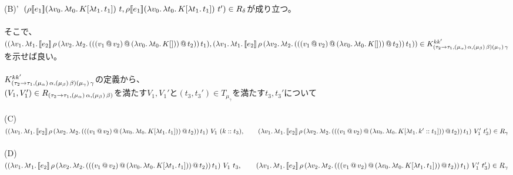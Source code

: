 \documentclass[japanese,draft]{jssst_ppl} %
\begin{document}
  (B)'\ $(\rho [\![{e_1}]\!] (\lambda{v_0}.\,{\lambda{t_0}.\,{K[\lambda{t_1}.\,{t_1}]}})\ t, \rho [\![{e_1}]\!] (\lambda{v_0}.\,{\lambda{t_0}.\,{K[\lambda{t_1}.\,{t_1}]}})\ t')\in R_{\delta}$が成り立つ。\\
\\
そこで、\\
$((\lambda{v_1}.\,{\lambda{t_1}.\,{[\![{e_2}]\!]\,\rho\,(\lambda{v_2}.\,{\lambda{t_2}.\,{({({({v_1}\,@\,{v_2})}\,@\,{(\lambda{v_0}.\,{\lambda{t_0}.\,{K[]}})})}\,@\,{t_2})}})\,t_1}}),\\
 (\lambda{v_1}.\,{\lambda{t_1}.\,{[\![{e_2}]\!]\,\rho\,(\lambda{v_2}.\,{\lambda{t_2}.\,{({({({v_1}\,@\,{v_2})}\,@\,{(\lambda{v_0}.\,{\lambda{t_0}.\,{K[]}})})}\,@\,{t_2})}})\,t_1}}))\in K^{kk'}_{(\tau_2\rightarrow{\tau_1},(\mu_{\alpha})\,\alpha,(\mu_{\beta})\,\beta) (\mu_{\gamma})\,\gamma}$\\
 を示せば良い。\\
 \\
 $K^{kk'}_{(\tau_2\rightarrow{\tau_1},(\mu_{\alpha})\,\alpha,(\mu_{\beta})\,\beta) (\mu_{\gamma})\,\gamma}$の定義から、\\
 $(V_1,V_1')\in R_{(\tau_2\rightarrow{\tau_1},(\mu_{\alpha})\,\alpha,(\mu_{\beta})\,\beta)}$を満たす$V_1,V_1'$と$(t_3,t_3')\in T_{\mu_{\gamma}}$を満たす$t_3,t_3'$について\\
 \\
 (C)\ $(\LamP{v_1}{\Lam{t_1}{\CPS{e_2}{\rho}
            {\LamP{v_2}{\Lam{t_2}
                {\AppP{\AppP{\AppP{v_1}{v_2}}
                    {\LamP{v_0}{\Lam{t_0}
                        {K[\Lam{t_1}{t_1}]}}}}{t_2}}}}{t_1}}}\ V_1\ (\Cons{k}{t_3}),\\
   \qquad    \LamP{v_1}{\Lam{t_1}{\CPS{e_2}{\rho}
            {\LamP{v_2}{\Lam{t_2}
                {\AppP{\AppP{\AppP{v_1}{v_2}}
                    {\LamP{v_0}{\Lam{t_0}
                        {K[\Lam{t_1}{\Cons{k'}{t_1}}]}}}}{t_2}}}}{t_1}}}\ V_1'\ t_3')\in R_{\gamma}$\\
   \\
 (D)\ $(\LamP{v_1}{\Lam{t_1}{\CPS{e_2}{\rho}
            {\LamP{v_2}{\Lam{t_2}
                {\AppP{\AppP{\AppP{v_1}{v_2}}
                    {\LamP{v_0}{\Lam{t_0}
                        {K[\Lam{t_1}{t_1}]}}}}{t_2}}}}{t_1}}}\ V_1\ t_3,\\
   \qquad    \LamP{v_1}{\Lam{t_1}{\CPS{e_2}{\rho}
            {\LamP{v_2}{\Lam{t_2}
                {\AppP{\AppP{\AppP{v_1}{v_2}}
                    {\LamP{v_0}{\Lam{t_0}
                        {K[\Lam{t_1}{t_1}]}}}}{t_2}}}}{t_1}}}\ V_1'\ t_3')\in R_{\gamma}$\\
\end{document}
